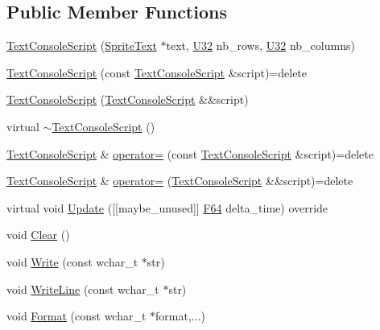 \subsection*{Public Member Functions}
\begin{DoxyCompactItemize}
\item 
\hyperlink{classmage_1_1_text_console_script_ae7b18ccaf8f9b3b1f4b7562017fa3465}{Text\+Console\+Script} (\hyperlink{classmage_1_1_sprite_text}{Sprite\+Text} $\ast$text, \hyperlink{namespacemage_a41c104c036fba3756a74e19f793eeaa1}{U32} nb\+\_\+rows, \hyperlink{namespacemage_a41c104c036fba3756a74e19f793eeaa1}{U32} nb\+\_\+columns)
\item 
\hyperlink{classmage_1_1_text_console_script_ad31e204ced04dc42fb98397df6015198}{Text\+Console\+Script} (const \hyperlink{classmage_1_1_text_console_script}{Text\+Console\+Script} \&script)=delete
\item 
\hyperlink{classmage_1_1_text_console_script_a6d245efb103011f1b2e2c43c590c22bf}{Text\+Console\+Script} (\hyperlink{classmage_1_1_text_console_script}{Text\+Console\+Script} \&\&script)
\item 
virtual \hyperlink{classmage_1_1_text_console_script_a3269d6b792053d4ce13d63103ca5b4e9}{$\sim$\+Text\+Console\+Script} ()
\item 
\hyperlink{classmage_1_1_text_console_script}{Text\+Console\+Script} \& \hyperlink{classmage_1_1_text_console_script_af7da3f0735f72fed0d6fc265b6ae07e9}{operator=} (const \hyperlink{classmage_1_1_text_console_script}{Text\+Console\+Script} \&script)=delete
\item 
\hyperlink{classmage_1_1_text_console_script}{Text\+Console\+Script} \& \hyperlink{classmage_1_1_text_console_script_a2a14c6a981fe7ded4e7a4fa5480ac6cb}{operator=} (\hyperlink{classmage_1_1_text_console_script}{Text\+Console\+Script} \&\&script)=delete
\item 
virtual void \hyperlink{classmage_1_1_text_console_script_afc6fbebca3b5a3bf433777c93e6e27d6}{Update} (\mbox{[}\mbox{[}maybe\+\_\+unused\mbox{]}\mbox{]} \hyperlink{namespacemage_ad26233bbec640deda836e572c1a23708}{F64} delta\+\_\+time) override
\item 
void \hyperlink{classmage_1_1_text_console_script_aff5acec462f505735720a17d541ba912}{Clear} ()
\item 
void \hyperlink{classmage_1_1_text_console_script_a659586a498f8ff0f55aa2a3f25f0828b}{Write} (const wchar\+\_\+t $\ast$str)
\item 
void \hyperlink{classmage_1_1_text_console_script_a24fe33795c69e70d07a680826cfafcc1}{Write\+Line} (const wchar\+\_\+t $\ast$str)
\item 
void \hyperlink{classmage_1_1_text_console_script_a4d9ba97e4ff4ad5390b20e5523a20e92}{Format} (const wchar\+\_\+t $\ast$format,...)
\end{DoxyCompactItemize}
